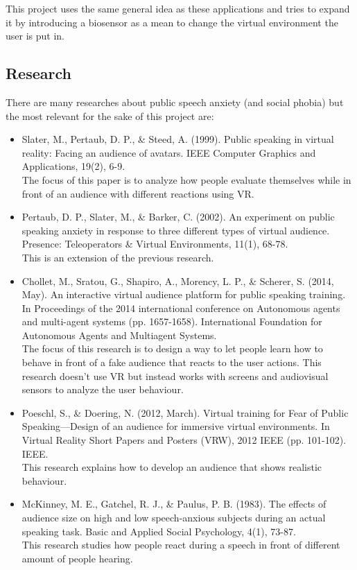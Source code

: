 This project uses the same general idea as these applications and tries to expand it by introducing a biosensor as a mean to change the virtual environment the user is put in. 

\subsection{Research}
There are many researches about public speech anxiety (and social phobia) but the most relevant for the sake of this project are:

\begin{itemize}
	\item Slater, M., Pertaub, D. P., \& Steed, A. (1999). Public speaking in virtual reality: Facing an audience of avatars. IEEE Computer Graphics and Applications, 19(2), 6-9.\\[0.15cm]
	The focus of this paper is to analyze how people evaluate themselves while in front of an audience with different reactions using VR.
	
	\item Pertaub, D. P., Slater, M., \& Barker, C. (2002). An experiment on public speaking anxiety in response to three different types of virtual audience. Presence: Teleoperators \& Virtual Environments, 11(1), 68-78.\\[0.15cm]
	This is an extension of the previous research.
	
	\item Chollet, M., Sratou, G., Shapiro, A., Morency, L. P., \& Scherer, S. (2014, May). An interactive virtual audience platform for public speaking training. In Proceedings of the 2014 international conference on Autonomous agents and multi-agent systems (pp. 1657-1658). International Foundation for Autonomous Agents and Multiagent Systems.\\[0.15cm]
	The focus of this research is to design a way to let people learn how to behave in front of a fake audience that reacts to the user actions. This research doesn't use VR but instead works with screens and audiovisual sensors to analyze the user behaviour.
	
	\item Poeschl, S., \& Doering, N. (2012, March). Virtual training for Fear of Public Speaking—Design of an audience for immersive virtual environments. In Virtual Reality Short Papers and Posters (VRW), 2012 IEEE (pp. 101-102). IEEE.\\[0.15cm]
	This research explains how to develop an audience that shows realistic behaviour.
	
	\item McKinney, M. E., Gatchel, R. J., \& Paulus, P. B. (1983). The effects of audience size on high and low speech-anxious subjects during an actual speaking task. Basic and Applied Social Psychology, 4(1), 73-87.\\[0.15cm]
	This research studies how people react during a speech in front of different amount of people hearing.
\end{itemize}